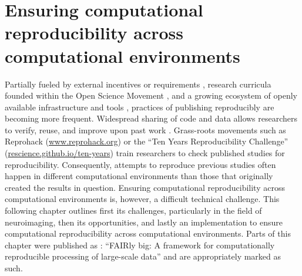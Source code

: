 


\chapter{Ensuring computational reproducibility across computational environments}
\label{chap:k3}

Partially fueled by external incentives or requirements \citep{mckiernan2016open} \citep{dfg}, research curricula founded within the Open Science Movement \citep{munafo2017manifesto} \citep{poldrack2017scanning}, and a growing ecosystem of openly available infrastructure and tools \citep{NISO2022119623}, practices of publishing reproducibly are becoming more frequent.
Widespread sharing of code and data allows researchers to verify, reuse, and improve upon past work \citep{borghi2018data}.
Grass-roots movements such as Reprohack (\href{https://www.reprohack.org/}{www.reprohack.org}) or the ``Ten Years Reproducibility Challenge'' (\href{https://rescience.github.io/ten-years/}{rescience.github.io/ten-years}) train researchers to check published studies for reproducibility.
Consequently, attempts to reproduce previous studies often happen in different computational environments than those that originally created the results in question.
Ensuring computational reproducibility across computational environments is, however, a difficult technical challenge.
This following chapter outlines first its challenges, particularly in the field of neuroimaging, then its opportunities, and lastly an implementation to ensure computational reproducibility across computational environments.
Parts of this chapter were published as \citet{wagner2022fairly}: ``FAIRly big: A framework for computationally reproducible processing of large-scale data'' and are appropriately marked as such.


